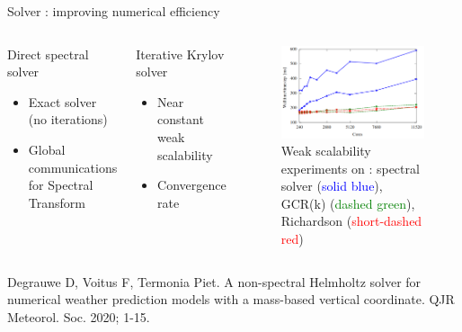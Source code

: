 \documentclass{beamer}
\begin{document}
\begin{frame}{Solver : improving numerical efficiency}

    \begin{columns}
        \begin{block}{Direct spectral solver}
            \begin{itemize}
                \item[\textcolor{blue}{\faIcon{plus}}] Exact solver (no iterations)
                \item[\textcolor{red}{\faIcon{minus}}] Global communications for Spectral Transform 
            \end{itemize}
        \end{block}
    
        \begin{block}{Iterative Krylov solver}
            \begin{itemize}
                \item[\textcolor{blue}{\faIcon{plus}}] Near constant weak scalability
                \item[\textcolor{red}{\faIcon{minus}}] Convergence rate
            \end{itemize}
        \end{block}


        \begin{figure}
            \centering
            \includegraphics[scale=0.25]{png/weak_scalability_beaufix.png}
            \caption{\footnotesize  Weak scalability experiments on : spectral solver (\textcolor{blue}{solid blue}), GCR(k) (\textcolor{green}{dashed green}), 
            Richardson (\textcolor{red}{short-dashed red})}
            \label{fig:evolution_chaotique}
        \end{figure}
    \end{columns}

    \tiny Degrauwe D, Voitus F, Termonia Piet. A non-spectral Helmholtz solver for numerical weather prediction models with a mass-based vertical coordinate. QJR Meteorol. Soc. 2020; 1-15. 

\end{frame}
\end{document}
